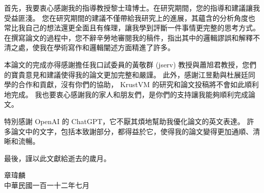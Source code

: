 
\begin{acknowledgement}

%
%
%
%
%

首先，我要衷心感謝我的指導教授黎士瑋博士。在研究期間，您的指導和建議讓我受益匪淺。
您在研究期間的建議不僅帶給我研究上的進展，其蘊含的分析角度也常比我自己的想法還更全面且有條理，讓我學到評斷一件事情更完整的思考方式。
在撰寫論文的過程中，您不辭辛勞地審閱我的稿件，指出其中的邏輯謬誤和解釋不清之處，使我在學術寫作和邏輯闡述方面精進了許多。

本論文的完成亦得感謝擔任我口試委員的黃敬群 (jserv) 教授與蕭旭君教授，您們的寶貴意見和建議使得我的論文更加完整和嚴謹。
此外，感謝江昱勳與杜展廷同學的合作和貢獻，沒有你們的協助， KrustVM 的研究和論文投稿將不會如此順利地完成。
我也要衷心感謝我的家人和朋友們，是你們的支持讓我能夠順利完成論文。

特別感謝 OpenAI 的 ChatGPT，它不厭其煩地幫助我優化論文的英文表達。
許多論文中的文字，包括本致謝部分，都得益於它，使得我的論文變得更加通順、清晰和流暢。

最後，謹以此文獻給逝去的歲月。
\begin{flushright}
章瑋麟\\
中華民國一百一十二年七月
\end{flushright}

\end{acknowledgement}
